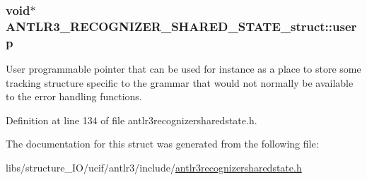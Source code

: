 \hypertarget{struct_a_n_t_l_r3___r_e_c_o_g_n_i_z_e_r___s_h_a_r_e_d___s_t_a_t_e__struct_ada973890eb8e4d287e177273ca5960a5}{
\subsubsection[{userp}]{\setlength{\rightskip}{0pt plus 5cm}void$\ast$ A\-N\-T\-L\-R3\-\_\-\-R\-E\-C\-O\-G\-N\-I\-Z\-E\-R\-\_\-\-S\-H\-A\-R\-E\-D\-\_\-\-S\-T\-A\-T\-E\-\_\-struct\-::userp}}\label{struct_a_n_t_l_r3___r_e_c_o_g_n_i_z_e_r___s_h_a_r_e_d___s_t_a_t_e__struct_ada973890eb8e4d287e177273ca5960a5}
User programmable pointer that can be used for instance as a place to store some tracking structure specific to the grammar that would not normally be available to the error handling functions. 

Definition at line 134 of file antlr3recognizersharedstate.\-h.



The documentation for this struct was generated from the following file\-:\begin{DoxyCompactItemize}
\item 
libs/structure\-\_\-\-I\-O/ucif/antlr3/include/\hyperlink{antlr3recognizersharedstate_8h}{antlr3recognizersharedstate.\-h}\end{DoxyCompactItemize}
